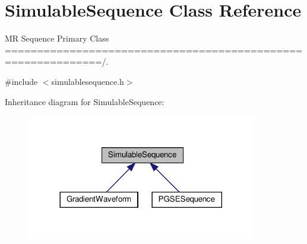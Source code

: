 \hypertarget{class_simulable_sequence}{}\section{Simulable\+Sequence Class Reference}
\label{class_simulable_sequence}


MR Sequence Primary Class =============================================================/.  




{\ttfamily \#include $<$simulablesequence.\+h$>$}



Inheritance diagram for Simulable\+Sequence\+:\nopagebreak
\begin{figure}[H]
\begin{center}
\leavevmode
\includegraphics[width=284pt]{class_simulable_sequence__inherit__graph}
\end{center}
\end{figure}
